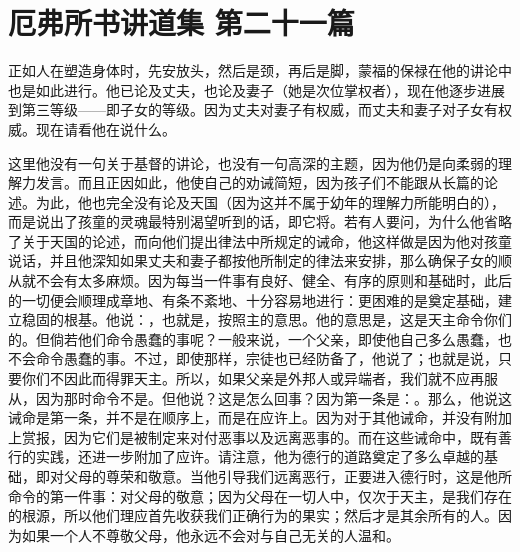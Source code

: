 

\section{厄弗所书讲道集 第二十一篇}

\par

\par

正如人在塑造身体时，先安放头，然后是颈，再后是脚，蒙福的保禄在他的讲论中也是如此进行。他已论及丈夫，也论及妻子（她是次位掌权者），现在他逐步进展到第三等级——即子女的等级。因为丈夫对妻子有权威，而丈夫和妻子对子女有权威。现在请看他在说什么。\par

\par

这里他没有一句关于基督的讲论，也没有一句高深的主题，因为他仍是向柔弱的理解力发言。而且正因如此，他使自己的劝诫简短，因为孩子们不能跟从长篇的论述。为此，他也完全没有论及天国（因为这并不属于幼年的理解力所能明白的），而是说出了孩童的灵魂最特别渴望听到的话，即它将。若有人要问，为什么他省略了关于天国的论述，而向他们提出律法中所规定的诫命，他这样做是因为他对孩童说话，并且他深知如果丈夫和妻子都按他所制定的律法来安排，那么确保子女的顺从就不会有太多麻烦。因为每当一件事有良好、健全、有序的原则和基础时，此后的一切便会顺理成章地、有条不紊地、十分容易地进行：更困难的是奠定基础，建立稳固的根基。他说：，也就是，按照主的意思。他的意思是，这是天主命令你们的。但倘若他们命令愚蠢的事呢？一般来说，一个父亲，即使他自己多么愚蠢，也不会命令愚蠢的事。不过，即使那样，宗徒也已经防备了，他说了；也就是说，只要你们不因此而得罪天主。所以，如果父亲是外邦人或异端者，我们就不应再服从，因为那时命令不是。但他说？这是怎么回事？因为第一条是：。那么，他说这诫命是第一条，并不是在顺序上，而是在应许上。因为对于其他诫命，并没有附加上赏报，因为它们是被制定来对付恶事以及远离恶事的。而在这些诫命中，既有善行的实践，还进一步附加了应许。请注意，他为德行的道路奠定了多么卓越的基础，即对父母的尊荣和敬意。当他引导我们远离恶行，正要进入德行时，这是他所命令的第一件事：对父母的敬意；因为父母在一切人中，仅次于天主，是我们存在的根源，所以他们理应首先收获我们正确行为的果实；然后才是其余所有的人。因为如果一个人不尊敬父母，他永远不会对与自己无关的人温和。\par

